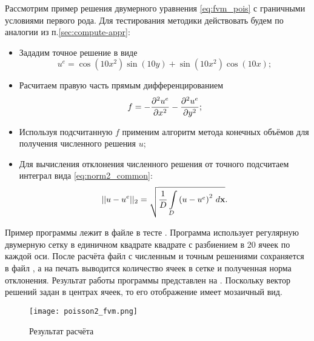 Рассмотрим пример решения двумерного уравнения \cref{eq:fvm_pois}
с граничными условиями первого рода.
Для тестирования методики действовать будем
по аналогии из п.\ref{sec:compute-appr}:
\begin{itemize}
\item
Зададим точное решение в виде
$$
u^e = \cos(10 x^2) \sin(10 y) + \sin(10 x^2)\cos(10 x);
$$
\item
Расчитаем правую часть прямым дифференцированием
$$
f = -\frac{\partial^2 u^e}{\partial x^2} - \frac{\partial^2 u^e}{\partial y^2};
$$
\item
Используя подсчитанную $f$ применим алгоритм метода конечных объёмов для
получения численного решения $u$;
\item
Для вычисления отклонения численного решения от точного подсчитаем интеграл вида
\cref{eq:norm2_common}:
\begin{equation}
\label{eq:fvm_norm2}
||u - u^e||_2 = \sqrt{\frac{1}{D}\arint{\left(u - u^e\right)^2}{D}{\vec x}}.
\end{equation}
\end{itemize}

Пример программы лежит в файле 
в тесте \cvar{[]}.
Программа использует регулярную двумерную
сетку в единичном квадрате квадрате с разбиением
в 20 ячеек по каждой оси.
После расчёта файл с численным и точным
решениями сохраняется в файл ,
а на печать выводится количество ячеек в сетке и полученная
норма отклонения. Результат работы программы представлен на .
Поскольку вектор решений задан в центрах ячеек, то его отображение имеет
мозаичный вид.

\begin{figure}[h!]
\centering
\texttt{[image: poisson2\_fvm.png]}
\caption{Результат расчёта}
\label{fig:poisson2_fvm}
\end{figure}

